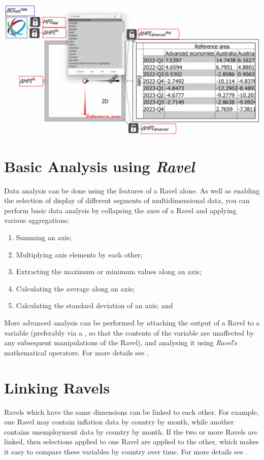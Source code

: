 \noindent\includegraphics[width=\textwidth]{images/tut07SeparatingAdvancedAverage}

\section{Basic Analysis using \emph{Ravel}}

Data analysis can be done using the features of a Ravel alone. As
well as enabling the selection of display of different segments of
multidimensional data, you can perform basic data analysis by collapsing
the axes of a Ravel and applying various aggregations:
\begin{enumerate}
\item Summing an axis;
\item Multiplying axis elements by each other;
\item Extracting the maximum or minimum values along an axis; 
\item Calculating the average along an axis;
\item Calculating the standard deviation of an axis; and
\end{enumerate}
More advanced analysis can be performed by attaching the output of
a Ravel to a variable (preferably via a , so that
the contents of the variable are unaffected by any subsequent manipulations
of the Ravel), and analysing it using \emph{Ravel}'s mathematical
operators. For more details see .

\section{Linking Ravels}

Ravels which have the same dimensions can be linked to each other.
For example, one Ravel may contain inflation data by country by month,
while another contains unemployment data by country by month. If the
two or more Ravels are linked, then selections applied to one Ravel
are applied to the other, which makes it easy to compare these variables
by country over time. For more details see .

